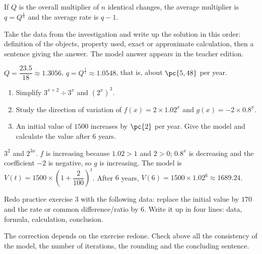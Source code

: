 \begin{summary}If $Q$ is the overall multiplier of $n$ identical changes, the average multiplier is $q=Q^{\frac1n}$ and the average rate is $q-1$.\end{summary}

\begin{example}
Take the data from the investigation and write up the solution in this order: definition of the objects, property used, exact or approximate calculation, then a sentence giving the answer. The model answer appears in the teacher edition.
\end{example}
\begin{solution}$Q=\dfrac{\num{23,5}}{18}\approx\num{1,3056}$, $q=Q^{\frac15}\approx\num{1,0548}$, that is, about $\pc{5,48}$ per year.\end{solution}

\begin{exercise}[essential]
\begin{enumerate}\item Simplify $3^{x+2}\div3^x$ and $(2^x)^3$.\item Study the direction of variation of $f(x)=2\times\num{1,02}^x$ and $g(x)=-2\times\num{0,8}^x$.\item An initial value of $1500$ increases by $\pc{2}$ per year. Give the model and calculate the value after $6$ years.\end{enumerate}
\end{exercise}
\begin{solution}$3^2$ and $2^{3x}$. $f$ is increasing because $\num{1,02}>1$ and $2>0$; $\num{0,8}^x$ is decreasing and the coefficient $-2$ is negative, so $g$ is increasing. The model is $V(t)=1500\times\left(1+\dfrac{2}{100}\right)^t$. After $6$ years, $V(6)=1500\times\num{1,02}^6\approx\num{1689,24}$.\end{solution}


\begin{homework}Redo practice exercise 3 with the following data: replace the initial value by $170$ and the rate or common difference/ratio by $6$. Write it up in four lines: data, formula, calculation, conclusion.\end{homework}
\begin{solution}The correction depends on the exercise redone. Check above all the consistency of the model, the number of iterations, the rounding and the concluding sentence.\end{solution}

